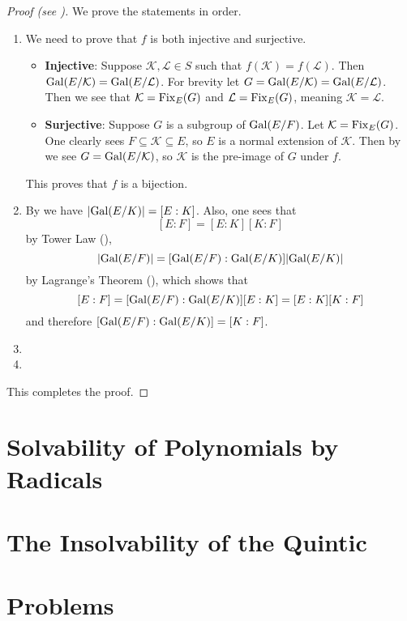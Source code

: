 \begin{proof}[Proof (see {\cite[Theorem 23.23]{judson_beezer_2022}})]
    We prove the statements in order.
    \begin{enumerate}
        \item We need to prove that $f$ is both injective and surjective.
        \begin{itemize}
            \item \textbf{Injective}: Suppose $\mathcal{K}, \mathcal{L} \in S$ such that $f(\mathcal{K}) = f(\mathcal{L})$. Then $\mathrm{Gal}(E/\mathcal{K}) = \mathrm{Gal}(E/\mathcal{L})$. For brevity let $G = \mathrm{Gal}(E/\mathcal{K}) = \mathrm{Gal}(E/\mathcal{L})$. Then we see that $\mathcal{K} = \mathrm{Fix}_{E}(G)$ and $\mathcal{L} = \mathrm{Fix}_{E}(G)$, meaning $\mathcal{K} = \mathcal{L}$.
            
            \item \textbf{Surjective}: Suppose $G$ is a subgroup of $\mathrm{Gal}(E/F)$. Let $\mathcal{K} = \mathrm{Fix}_{E}(G)$. One clearly sees $F \subseteq \mathcal{K} \subseteq E$, so $E$ is a normal extension of $\mathcal{K}$. Then by  we see $G = \mathrm{Gal}(E/\mathcal{K})$, so $\mathcal{K}$ is the pre-image of $G$ under $f$.
        \end{itemize}
        This proves that $f$ is a bijection.

        \item By  we have $|\mathrm{Gal}(E/K)| = [E:K]$. Also, one sees that
        \[
            [E:F] = [E:K][K:F]
        \]
        by Tower Law (),
        \[
            |\mathrm{Gal}(E/F)| = [\mathrm{Gal}(E/F):\mathrm{Gal}(E/K)]|\mathrm{Gal}(E/K)|
        \]
        by Lagrange's Theorem (), which shows that
        \[
            [E:F] = [\mathrm{Gal}(E/F):\mathrm{Gal}(E/K)][E:K] = [E:K][K:F]
        \]
        and therefore $[\mathrm{Gal}(E/F):\mathrm{Gal}(E/K)] = [K:F]$.

        \item %
        
        \item %
    \end{enumerate}
    This completes the proof.
\end{proof}

\section{Solvability of Polynomials by Radicals}

\section{The Insolvability of the Quintic}

\newpage

\section{Problems}

